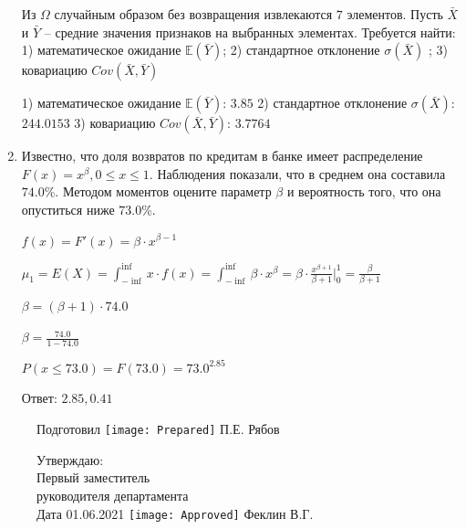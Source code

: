 \documentclass[a4paper,14pt]{article}
\begin{document}
\begin{enumerate}
Из $\Omega$ случайным образом без возвращения извлекаются $7$ элементов. 
Пусть $\bar X$ и $\bar Y$ – средние значения признаков на выбранных элементах. 
Требуется найти: 1) математическое ожидание $\mathbb{E}(\bar Y)$; 2) стандартное отклонение $\sigma(\bar X)$ ; 
3) ковариацию $Cov(\bar X, \bar Y)$




1) математическое ожидание $\mathbb{E}(\bar Y)$: $3.85$ 
2) стандартное отклонение $\sigma(\bar X)$: $244.0153$
3) ковариацию $Cov(\bar X, \bar Y)$: $3.7764$


\item

    
	Известно, что доля возвратов по кредитам в банке имеет распределение $F(x) = x^{\beta}, 0 \le x \le 1$. Наблюдения показали, что в среднем она составила $74.0$\%. Методом моментов оцените параметр $\beta$ и вероятность того, что она опуститься ниже $73.0$\%.
	


	

	$f(x) = F'(x) = \beta \cdot x^{\beta - 1}$

	$\mu_{1} = E(X) = \int_{-\inf}^{\inf}x \cdot f(x) = \int_{-\inf}^{\inf} \beta \cdot x^{\beta} = \beta \cdot \frac{x^{\beta + 1}}{\beta + 1}\bigg|_0^1 = \frac{\beta}{\beta + 1}$

	$\beta = (\beta + 1) \cdot 74.0$

	$\beta = \frac{74.0}{1 - 74.0}$

	$ P(x \le 73.0) = F(73.0) = 73.0^{2.85} $

    Ответ: $2.85, 0.41$
	

\end{enumerate}

\begin{figure}[H]
	Подготовил
	\hfill
	\texttt{[image: Prepared]}
	П.Е. Рябов
\end{figure}


\begin{figure}[H]
	Утверждаю:\\
	Первый заместитель\\
	руководителя департамента\\
	Дата 01.06.2021
	\hfill
	\texttt{[image: Approved]}
	Феклин В.Г.
\end{figure}
\end{document}
